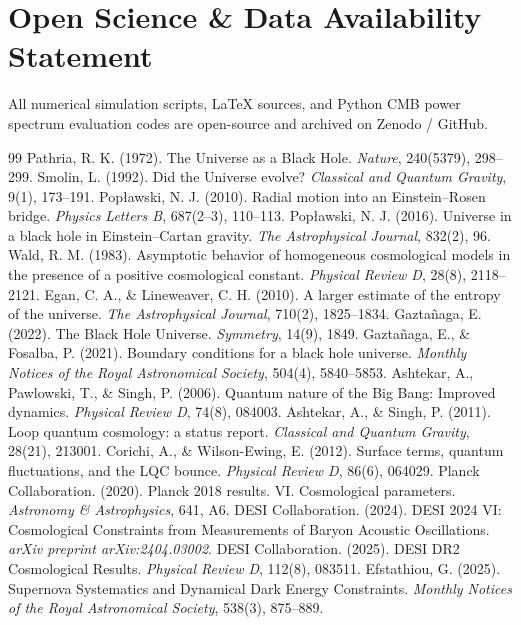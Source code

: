 \documentclass[11pt,a4paper]{article}
\theoremstyle{definition}
\begin{document}
\section{Open Science \& Data Availability Statement}\label{sec:open_science}
All numerical simulation scripts, LaTeX sources, and Python CMB power spectrum evaluation codes are open-source and archived on Zenodo / GitHub.

\begin{thebibliography}{99}
 Pathria, R. K. (1972). The Universe as a Black Hole. \textit{Nature}, 240(5379), 298--299.
 Smolin, L. (1992). Did the Universe evolve? \textit{Classical and Quantum Gravity}, 9(1), 173--191.
 Pop{\l}awski, N. J. (2010). Radial motion into an Einstein--Rosen bridge. \textit{Physics Letters B}, 687(2--3), 110--113.
 Pop{\l}awski, N. J. (2016). Universe in a black hole in Einstein--Cartan gravity. \textit{The Astrophysical Journal}, 832(2), 96.
 Wald, R. M. (1983). Asymptotic behavior of homogeneous cosmological models in the presence of a positive cosmological constant. \textit{Physical Review D}, 28(8), 2118--2121.
 Egan, C. A., \& Lineweaver, C. H. (2010). A larger estimate of the entropy of the universe. \textit{The Astrophysical Journal}, 710(2), 1825--1834.
 Gazta\~naga, E. (2022). The Black Hole Universe. \textit{Symmetry}, 14(9), 1849.
 Gazta\~naga, E., \& Fosalba, P. (2021). Boundary conditions for a black hole universe. \textit{Monthly Notices of the Royal Astronomical Society}, 504(4), 5840--5853.
 Ashtekar, A., Pawlowski, T., \& Singh, P. (2006). Quantum nature of the Big Bang: Improved dynamics. \textit{Physical Review D}, 74(8), 084003.
 Ashtekar, A., \& Singh, P. (2011). Loop quantum cosmology: a status report. \textit{Classical and Quantum Gravity}, 28(21), 213001.
 Corichi, A., \& Wilson-Ewing, E. (2012). Surface terms, quantum fluctuations, and the LQC bounce. \textit{Physical Review D}, 86(6), 064029.
 Planck Collaboration. (2020). Planck 2018 results. VI. Cosmological parameters. \textit{Astronomy \& Astrophysics}, 641, A6.
 DESI Collaboration. (2024). DESI 2024 VI: Cosmological Constraints from Measurements of Baryon Acoustic Oscillations. \textit{arXiv preprint arXiv:2404.03002}.
 DESI Collaboration. (2025). DESI DR2 Cosmological Results. \textit{Physical Review D}, 112(8), 083511.
 Efstathiou, G. (2025). Supernova Systematics and Dynamical Dark Energy Constraints. \textit{Monthly Notices of the Royal Astronomical Society}, 538(3), 875--889.
\end{thebibliography}
\end{document}
